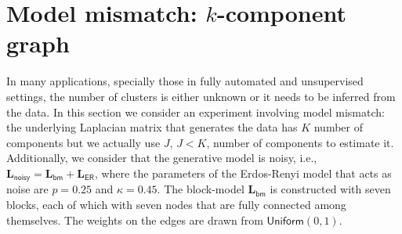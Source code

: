 \section{Model mismatch: $k$-component graph}

In many applications, specially those in fully automated and unsupervised settings,
the number of clusters is either unknown or it needs to be inferred from the data.
In this section we consider an experiment involving model mismatch: the underlying
Laplacian matrix that generates the data has $K$ number of components but we actually
use $J$, $J < K$, number of components to estimate it.
Additionally, we consider that the generative model is noisy, i.e.,
$\mathbf{L}_{\mathsf{noisy}} = \mathbf{L}_{\mathsf{bm}} + \mathbf{L}_{\mathsf{ER}}$,
where the parameters of the Erdos-Renyi model that acts as noise are $p = 0.25$ and
$\kappa = 0.45$. The block-model $\mathbf{L}_{\mathsf{bm}}$ is constructed with seven
blocks, each of which with seven nodes that are fully connected among themselves. The
weights on the edges are drawn from $\mathsf{Uniform}(0, 1)$.

